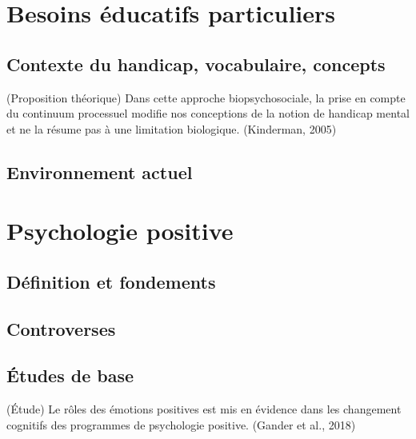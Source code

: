 \documentclass[
  french,
]{article}
\begin{document}
\hypertarget{besoins-uxe9ducatifs-particuliers}{%
\section{Besoins éducatifs particuliers}\label{besoins-uxe9ducatifs-particuliers}}

\hypertarget{contexte-du-handicap-vocabulaire-concepts}{%
\subsection{Contexte du handicap, vocabulaire, concepts}\label{contexte-du-handicap-vocabulaire-concepts}}

(Proposition théorique) Dans cette approche biopsychosociale, la prise en compte du continuum processuel modifie nos conceptions de la notion de handicap mental et ne la résume pas à une limitation biologique. (Kinderman, 2005)

\hypertarget{environnement-actuel}{%
\subsection{Environnement actuel}\label{environnement-actuel}}

\hypertarget{psychologie-positive}{%
\section{Psychologie positive}\label{psychologie-positive}}

\hypertarget{duxe9finition-et-fondements}{%
\subsection{Définition et fondements}\label{duxe9finition-et-fondements}}

\hypertarget{controverses}{%
\subsection{Controverses}\label{controverses}}

\hypertarget{uxe9tudes-de-base}{%
\subsection{Études de base}\label{uxe9tudes-de-base}}

(Étude) Le rôles des émotions positives est mis en évidence dans les changement cognitifs des programmes de psychologie positive. (Gander et al., 2018)
\end{document}
